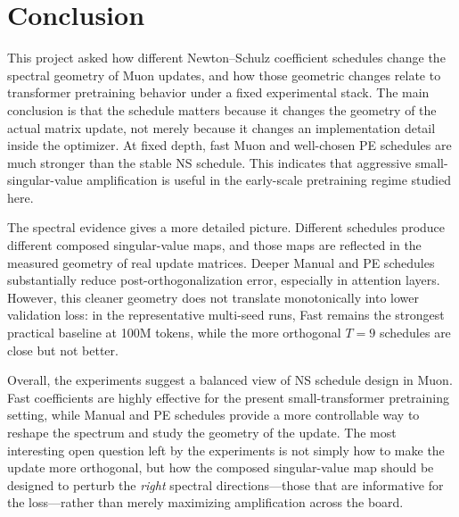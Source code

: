 \documentclass[10pt]{article}
\begin{document}
\FloatBarrier

\section{Conclusion}
This project asked how different Newton--Schulz coefficient schedules change the spectral geometry of Muon updates, and how those geometric changes relate to transformer pretraining behavior under a fixed experimental stack. The main conclusion is that the schedule matters because it changes the geometry of the actual matrix update, not merely because it changes an implementation detail inside the optimizer. At fixed depth, fast Muon and well-chosen PE schedules are much stronger than the stable NS schedule. This indicates that aggressive small-singular-value amplification is useful in the early-scale pretraining regime studied here.

The spectral evidence gives a more detailed picture. Different schedules produce different composed singular-value maps, and those maps are reflected in the measured geometry of real update matrices. Deeper Manual and PE schedules substantially reduce post-orthogonalization error, especially in attention layers. However, this cleaner geometry does not translate monotonically into lower validation loss: in the representative multi-seed runs, Fast remains the strongest practical baseline at 100M tokens, while the more orthogonal $T=9$ schedules are close but not better.

Overall, the experiments suggest a balanced view of NS schedule design in Muon. Fast coefficients are highly effective for the present small-transformer pretraining setting, while Manual and PE schedules provide a more controllable way to reshape the spectrum and study the geometry of the update. The most interesting open question left by the experiments is not simply how to make the update more orthogonal, but how the composed singular-value map should be designed to perturb the \emph{right} spectral directions---those that are informative for the loss---rather than merely maximizing amplification across the board.

\begingroup
\footnotesize
\setlength{\bibsep}{1.5pt}


\endgroup
\end{document}
